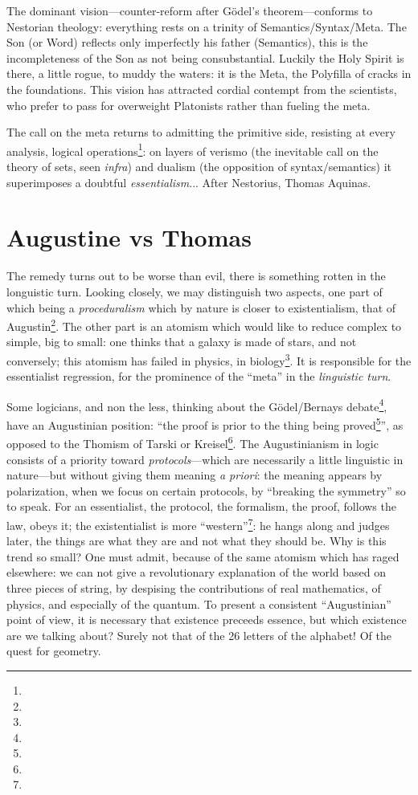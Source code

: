 \documentclass{article}
\begin{document}
The dominant vision---counter-reform after Gödel's theorem---conforms to Nestorian theology: everything rests on a trinity of Semantics/Syntax/Meta. The Son (or Word) reflects only imperfectly his father (Semantics), this is the incompleteness of the Son as not being consubstantial. Luckily the Holy Spirit is there, a little rogue, to muddy the waters: it is the Meta, the Polyfilla of cracks in the foundations. This vision has attracted cordial contempt from the scientists, who prefer to pass for overweight Platonists rather than fueling the meta.

The call on the meta returns to admitting the primitive side, resisting at every analysis, logical operations\footnote{}: on layers of verismo (the inevitable call on the theory of sets, seen \emph{infra}) and dualism (the opposition of syntax/semantics) it superimposes a doubtful \emph{essentialism}... After Nestorius, Thomas Aquinas.

\section{Augustine vs Thomas}
The remedy turns out to be worse than evil, there is something rotten in the longuistic turn. Looking closely, we may distinguish two aspects, one part of which being a \emph{proceduralism} which by nature is closer to existentialism, that of Augustin\footnote{}. The other part is an atomism which would like to reduce complex to simple, big to small: one thinks that a galaxy is made of stars, and not conversely; this atomism has failed in physics, in biology\footnote{}. It is responsible for the essentialist regression, for the prominence of the \enquote{meta} in the \emph{linguistic turn}.

Some logicians, and non the less, thinking about the Gödel/Bernays debate\footnote{}, have an Augustinian position: \enquote{the proof is prior to the thing being proved\footnote{}}, as opposed to the Thomism of Tarski or Kreisel\footnote{}. The Augustinianism in logic consists of a priority toward \emph{protocols}---which are necessarily a little linguistic in nature---but without giving them meaning \emph{a priori}: the meaning appears by polarization, when we focus on certain protocols, by \enquote{breaking the symmetry} so to speak. For an essentialist, the protocol, the formalism, the proof, follows the law, obeys it; the existentialist is more \enquote{western}\footnote{}: he hangs along and judges later, the things are what they are and not what they should be. Why is this trend so small? One must admit, because of the same atomism which has raged elsewhere: we can not give a revolutionary explanation of the world based on three pieces of string, by despising the contributions of real mathematics, of physics, and especially of the quantum. To present a consistent \enquote{Augustinian} point of view, it is necessary that existence preceeds essence, but which existence are we talking about? Surely not that of the 26 letters of the alphabet! Of the quest for geometry.
\end{document}
